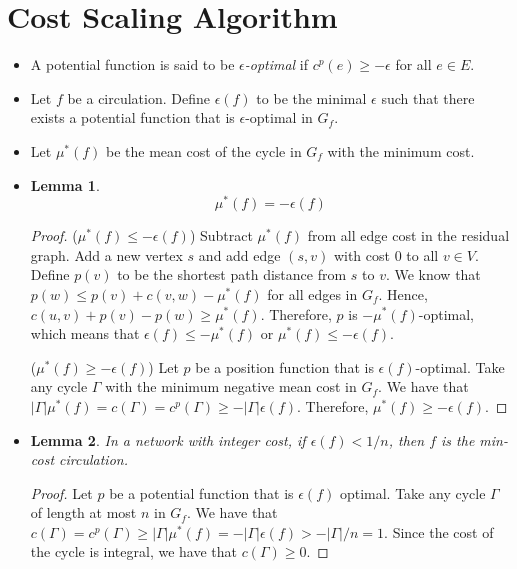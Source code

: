 \documentclass[10pt]{article}
\newtheorem{lemma}{Lemma}[section]
\begin{document}
  \section{Cost Scaling Algorithm} %
  \label{sec:cost_scaling_algorithm}
    \begin{itemize}
      \item A potential function is said to be \emph{$\epsilon$-optimal}
        if $c^p(e) \geq -\epsilon$ for all $e \in E.$
        
      \item Let $f$ be a circulation. Define $\epsilon(f)$ to
        be the minimal $\epsilon$ such that there exists a potential
        function that is $\epsilon$-optimal in $G_f$.
        
      \item Let $\mu^*(f)$ be the mean cost of the cycle in $G_f$
        with the minimum cost.
        
      \item
        \begin{lemma}
          $$\mu^*(f) = -\epsilon(f)$$
        \end{lemma}
        \begin{proof}
          ($\mu^*(f) \leq - \epsilon(f)$) Subtract $\mu^*(f)$ from
            all edge cost in the residual graph. Add a new vertex $s$
            and add edge $(s,v)$ with cost $0$ to all $v \in V.$ 
            Define $p(v)$ to be the shortest path distance from $s$ to $v$.
            We know that $p(w) \leq p(v) + c(v,w) - \mu^*(f)$ for all edges
            in $G_f.$ Hence, $c(u,v) + p(v) - p(w) \geq \mu^*(f).$
            Therefore, $p$ is $-\mu^*(f)$-optimal, which means that
            $\epsilon(f) \leq -\mu^*(f)$ or $\mu^*(f) \leq -\epsilon(f).$
            \medskip

          ($\mu^*(f) \geq -\epsilon(f)$) Let $p$ be a position function
            that is $\epsilon(f)$-optimal. Take any cycle $\Gamma$ 
            with the minimum negative mean cost in $G_f$. 
            We have that $|\Gamma| \mu^*(f) = c(\Gamma) = c^p(\Gamma) \geq -|\Gamma|\epsilon(f)$.
            Therefore, $\mu^*(f) \geq -\epsilon(f).$
        \end{proof}
      \item 
        \begin{lemma}
          In a network with integer cost, if $\epsilon(f) < 1/n$, then
          $f$ is the min-cost circulation. 
        \end{lemma}
        \begin{proof}
          Let $p$ be a potential function that is $\epsilon(f)$ optimal.
          Take any cycle $\Gamma$ of length at most $n$ in $G_f.$ We have that
          $c(\Gamma) = c^p(\Gamma) \geq |\Gamma|\mu^*(f) = -|\Gamma|\epsilon(f) > -|\Gamma|/n = 1.$
          Since the cost of the cycle is integral, we have that $c(\Gamma) \geq 0.$
          

\end{proof}
\end{itemize}
\end{document}
